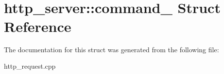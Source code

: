 \hypertarget{structhttp__server_1_1command__}{
\section{http\-\_\-server\-:\-:command\-\_\- \-Struct \-Reference}
\label{structhttp__server_1_1command__}
}


\-The documentation for this struct was generated from the following file\-:\begin{DoxyCompactItemize}
\item 
http\-\_\-request.\-cpp\end{DoxyCompactItemize}
